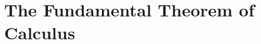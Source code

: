\section{The Fundamental Theorem of Calculus} \label{S:4.4.FTC}



\newpage



\newpage



\newpage



\newpage

\clearpage
